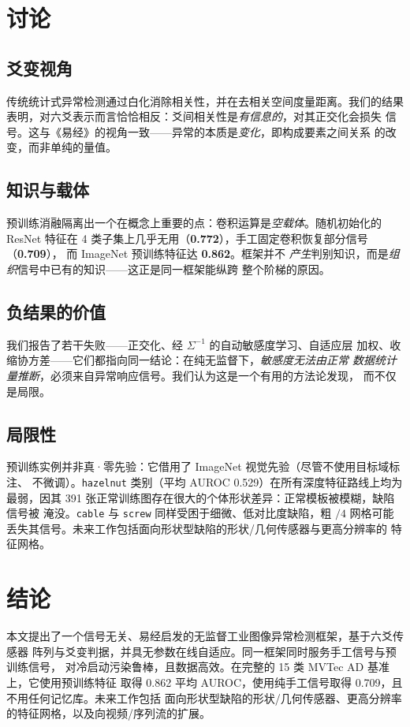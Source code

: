 \documentclass[journal,10pt]{IEEEtran}
\begin{document}
\section{讨论}
\subsection{爻变视角}
传统统计式异常检测通过白化消除相关性，并在去相关空间度量距离。我们的结果
表明，对六爻表示而言恰恰相反：爻间相关性是\emph{有信息的}，对其正交化会损失
信号。这与《易经》的视角一致——异常的本质是\emph{变化}，即构成要素之间关系
的改变，而非单纯的量值。

\subsection{知识与载体}
预训练消融隔离出一个在概念上重要的点：卷积运算是\emph{空载体}。随机初始化的
ResNet 特征在 4 类子集上几乎无用（\textbf{0.772}），手工固定卷积恢复部分信号（\textbf{0.709}），
而 ImageNet 预训练特征达 \textbf{0.862}。框架并不
\emph{产生}判别知识，而是\emph{组织}信号中已有的知识——这正是同一框架能纵跨
整个阶梯的原因。

\subsection{负结果的价值}
我们报告了若干失败——正交化、经 $\Sigma^{-1}$ 的自动敏感度学习、自适应层
加权、收缩协方差——它们都指向同一结论：在纯无监督下，\emph{敏感度无法由正常
数据统计量推断}，必须来自异常响应信号。我们认为这是一个有用的方法论发现，
而不仅是局限。

\subsection{局限性}
预训练实例并非真·零先验：它借用了 ImageNet 视觉先验（尽管不使用目标域标注、
不微调）。\texttt{hazelnut} 类别（平均 AUROC 0.529）在所有深度特征路线上均为
最弱，因其 391 张正常训练图存在很大的个体形状差异：正常模板被模糊，缺陷信号被
淹没。\texttt{cable} 与 \texttt{screw} 同样受困于细微、低对比度缺陷，粗 $/4$
网格可能丢失其信号。未来工作包括面向形状型缺陷的形状/几何传感器与更高分辨率的
特征网格。

\section{结论}
本文提出了一个信号无关、易经启发的无监督工业图像异常检测框架，基于六爻传感器
阵列与爻变判据，并具无参数在线自适应。同一框架同时服务手工信号与预训练信号，
对冷启动污染鲁棒，且数据高效。在完整的 15 类 MVTec AD 基准上，它使用预训练特征
取得 0.862 平均 AUROC，使用纯手工信号取得 0.709，且不用任何记忆库。未来工作包括
面向形状型缺陷的形状/几何传感器、更高分辨率的特征网格，以及向视频/序列流的扩展。
\end{document}
